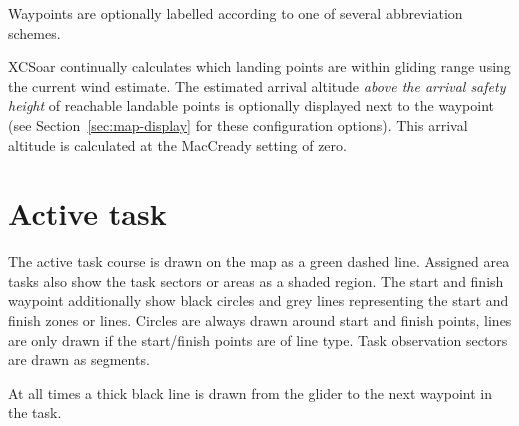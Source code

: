 \documentclass[a4paper,12pt]{refrep}
\begin{document}

Waypoints are optionally labelled according to one of several
abbreviation schemes.

XCSoar continually calculates which landing points are within gliding
range using the current wind estimate.  The estimated arrival altitude
{\em above the arrival safety height} of reachable landable points is
optionally displayed next to the waypoint (see
Section~\ref{sec:map-display} for these configuration options).  This
arrival altitude is calculated at the MacCready setting of zero.

\section{Active task}

The active task course is drawn on the map as a green dashed line.
Assigned area tasks also show the task sectors or areas as a shaded
region.  The start and finish waypoint additionally show black circles
and grey lines representing the start and finish zones or lines.
Circles are always drawn around start and finish points, lines are
only drawn if the start/finish points are of line type.  Task
observation sectors are drawn as segments.

At all times a thick black line is drawn from the glider to the next
waypoint in the task.
\end{document}
